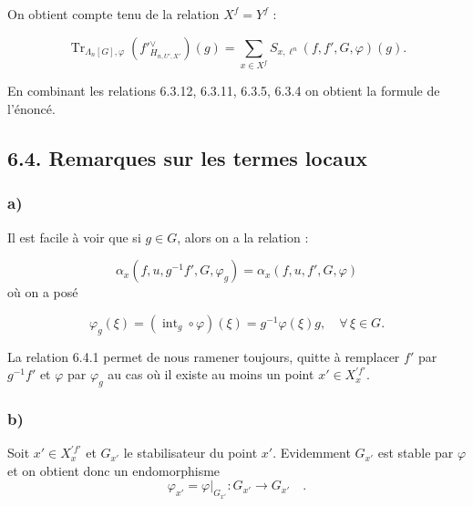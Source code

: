 \documentclass[11pt]{article}
\providecommand{\Tr}{\operatorname{Tr}}
\providecommand{\Tr}{\operatorname{Tr}}
\providecommand{\Tr}{\operatorname{Tr}}
\providecommand{\Tr}{\operatorname{Tr}}
\providecommand{\La}{\Lambda}
\providecommand{\Tr}{\operatorname{Tr}}
\begin{document}
On obtient compte tenu de la relation $X^f=Y^f$ :

\begin{equation}\tag{6.3.12}
\Tr_{\La_n[G],\varphi}(f'{}^\vee_{H_{n,U',X'}})(g)=\sum_{x\in X^f}S_{x,\ell^n}(f,f',G,\varphi)(g).
\end{equation}

En combinant les relations 6.3.12, 6.3.11, 6.3.5, 6.3.4 on obtient la formule de l'énoncé.

\subsection*{6.4. Remarques sur les termes locaux}
\subsubsection*{a)} Il est facile à voir que si $g\in G$, alors on a la relation :

\begin{equation}\tag{6.4.1}
\alpha_x(f,u,g^{-1}f',G,\varphi_g)=\alpha_x(f,u,f',G,\varphi)
\end{equation}
où on a posé

\begin{equation}\tag{6.4.2}
\varphi_g(\xi)=(\operatorname{int}_g\circ\varphi)(\xi)=g^{-1}\varphi(\xi)g,
\quad \forall\,\xi\in G.
\end{equation}

La relation 6.4.1 permet de nous ramener toujours, quitte à remplacer $f'$ par $g^{-1}f'$ et $\varphi$ par $\varphi_g$ au cas où il existe au moins un point $x'\in X_x^{\prime f'}$.

\subsubsection*{b)} Soit $x'\in X_x^{\prime f'}$ et $G_{x'}$ le stabilisateur du point $x'$. Evidemment $G_{x'}$ est stable par $\varphi$ et on obtient donc un endomorphisme%
\[
\varphi_{x'} = \varphi|_{G_{x'}} : G_{x'} \longrightarrow G_{x'} \quad .
\]
\end{document}
